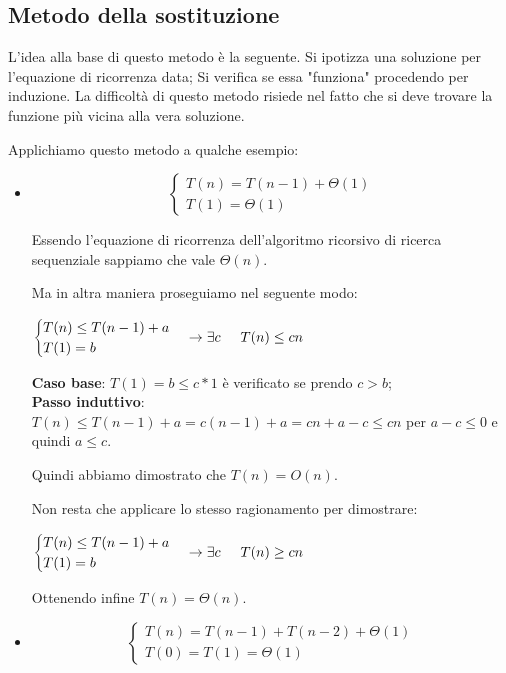 \subsection*{Metodo della sostituzione}
L’idea alla base di questo metodo è la seguente. Si ipotizza una soluzione per l’equazione di ricorrenza data; Si verifica se essa "funziona" procedendo per induzione. La difficoltà di questo metodo risiede nel fatto che si deve trovare la funzione più vicina alla vera soluzione.

Applichiamo questo metodo a qualche esempio:
\begin{itemize}
    \item $$\begin{cases}T(n) = T(n-1) + \Theta(1)\\T(1) = \Theta(1)\end{cases}$$

    Essendo l'equazione di ricorrenza dell'algoritmo ricorsivo di ricerca sequenziale sappiamo che vale $\Theta(n)$.
    
    Ma in altra maniera proseguiamo nel seguente modo:
    
    $\begin{cases}T(n) \leq T(n-1) + a\\T(1) = b\end{cases}\to\exists c\hspace{0.5cm}T(n)\leq cn$
    
    \textbf{Caso base}: $T(1)=b\leq c*1$ è verificato se prendo $c>b$;\\
    \textbf{Passo induttivo}: $T(n)\leq T(n-1)+a=c(n-1)+a=cn+a-c\leq cn$ per $a-c\leq 0$ e quindi $a\leq c$.
    
    Quindi abbiamo dimostrato che $T(n)=O(n)$.
    
    Non resta che applicare lo stesso ragionamento per dimostrare:
    
    $\begin{cases}T(n) \leq T(n-1) + a\\T(1) = b\end{cases}\to\exists c\hspace{0.5cm}T(n)\geq cn$
    
    Ottenendo infine $T(n)=\Theta(n)$.

    \item $$\begin{cases}T(n) = T(n-1) + T(n-2) +\Theta(1)\\T(0)=T(1)=\Theta(1)\end{cases}$$
    

\end{itemize}
